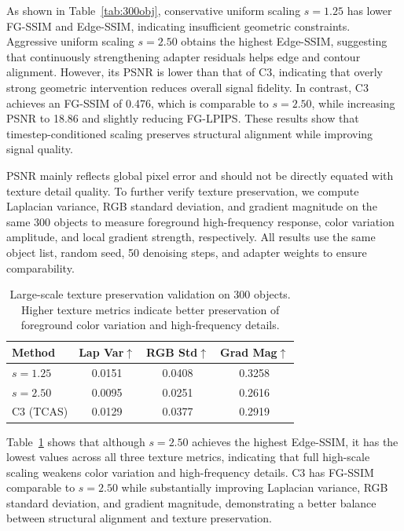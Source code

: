 \documentclass[times,twocolumn,final]{elsarticle}
\begin{document}
As shown in Table~\ref{tab:300obj}, conservative uniform scaling $s = 1.25$ has lower FG-SSIM and Edge-SSIM, indicating insufficient geometric constraints. Aggressive uniform scaling $s = 2.50$ obtains the highest Edge-SSIM, suggesting that continuously strengthening adapter residuals helps edge and contour alignment. However, its PSNR is lower than that of C3, indicating that overly strong geometric intervention reduces overall signal fidelity. In contrast, C3 achieves an FG-SSIM of 0.476, which is comparable to $s = 2.50$, while increasing PSNR to 18.86 and slightly reducing FG-LPIPS. These results show that timestep-conditioned scaling preserves structural alignment while improving signal quality.

PSNR mainly reflects global pixel error and should not be directly equated with texture detail quality. To further verify texture preservation, we compute Laplacian variance, RGB standard deviation, and gradient magnitude on the same 300 objects to measure foreground high-frequency response, color variation amplitude, and local gradient strength, respectively. All results use the same object list, random seed, 50 denoising steps, and adapter weights to ensure comparability.


\begin{table}[t]
\centering
\caption{Large-scale texture preservation validation on 300 objects. Higher texture metrics indicate better preservation of foreground color variation and high-frequency details.}
\label{tab:texture300}
\small
\begin{tabular}{lccc}
\toprule
Method & Lap Var$\uparrow$ & RGB Std$\uparrow$ & Grad Mag$\uparrow$ \\
\midrule
$s = 1.25$ & 0.0151 & 0.0408 & 0.3258 \\
$s = 2.50$ & 0.0095 & 0.0251 & 0.2616 \\
C3 (TCAS) & 0.0129 & 0.0377 & 0.2919 \\
\bottomrule
\end{tabular}
\end{table}

Table~\ref{tab:texture300} shows that although $s = 2.50$ achieves the highest Edge-SSIM, it has the lowest values across all three texture metrics, indicating that full high-scale scaling weakens color variation and high-frequency details. C3 has FG-SSIM comparable to $s = 2.50$ while substantially improving Laplacian variance, RGB standard deviation, and gradient magnitude, demonstrating a better balance between structural alignment and texture preservation.
\end{document}
